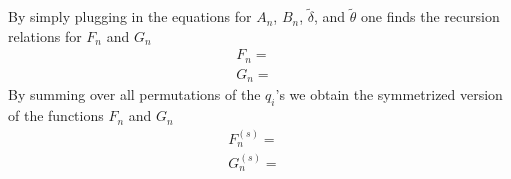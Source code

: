 By simply plugging in the equations for $A_n$, $B_n$, $\tilde{\delta}$, and $\tilde{\theta}$ one finds the recursion relations for $F_n$ and $G_n$
\begin{equation}
	\begin{split}
		F_n =& \\
		G_n =&
	\end{split}
\end{equation}
By summing over all permutations of the $q_i$'s we obtain the symmetrized version of the functions $F_n$ and $G_n$ 
\begin{equation}
	\begin{split}
		F^{(s)}_n =& \\
		G_n^{(s)} =&
	\end{split}
\end{equation}

